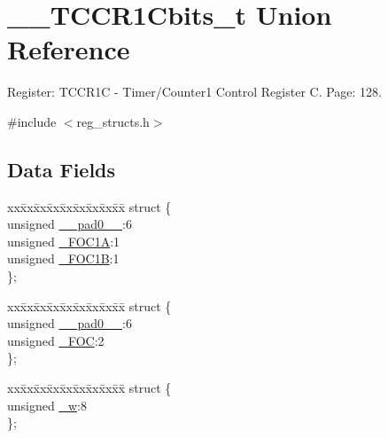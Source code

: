 \hypertarget{union_____t_c_c_r1_cbits__t}{\section{\+\_\+\+\_\+\+T\+C\+C\+R1\+Cbits\+\_\+t Union Reference}
\label{union_____t_c_c_r1_cbits__t}
}


Register\+: T\+C\+C\+R1\+C -\/ Timer/\+Counter1 Control Register C. Page\+: 128.  




{\ttfamily \#include $<$reg\+\_\+structs.\+h$>$}

\subsection*{Data Fields}
\begin{DoxyCompactItemize}
\item 
\begin{tabbing}
xx\=xx\=xx\=xx\=xx\=xx\=xx\=xx\=xx\=\kill
struct \{\\
\>unsigned \hyperlink{union_____t_c_c_r1_cbits__t_a3e462c51b759f394e47a431883de7d9d}{\_\_pad0\_\_}:6\\
\>unsigned \hyperlink{union_____t_c_c_r1_cbits__t_a5027ef60c8818b6d112135c182349aed}{\_FOC1A}:1\\
\>unsigned \hyperlink{union_____t_c_c_r1_cbits__t_a47c4a50d0ecb8263300cb0490ba0604f}{\_FOC1B}:1\\
\}; \\

\end{tabbing}\item 
\begin{tabbing}
xx\=xx\=xx\=xx\=xx\=xx\=xx\=xx\=xx\=\kill
struct \{\\
\>unsigned \hyperlink{union_____t_c_c_r1_cbits__t_a3e462c51b759f394e47a431883de7d9d}{\_\_pad0\_\_}:6\\
\>unsigned \hyperlink{union_____t_c_c_r1_cbits__t_a4567080ffc7b866aa6ed8149aa3ca782}{\_FOC}:2\\
\}; \\

\end{tabbing}\item 
\begin{tabbing}
xx\=xx\=xx\=xx\=xx\=xx\=xx\=xx\=xx\=\kill
struct \{\\
\>unsigned \hyperlink{union_____t_c_c_r1_cbits__t_a18051e4f4d67e6d511d1e176f80a8b54}{\_w}:8\\
\}; \\

\end{tabbing}\end{DoxyCompactItemize}


